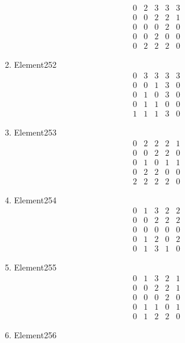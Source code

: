 \documentclass[12pt]{article}
\begin{document}
\begin{multicols}{3}
\begin{enumerate}
\begin{equation*}
\begin{array}{ccccc}
0&2&3&3&3\\
0&0&2&2&1\\
0&0&0&2&0\\
0&0&2&0&0\\
0&2&2&2&0
\end{array}
\end{equation*}
\item Element252
\begin{equation*}
\begin{array}{ccccc}
0&3&3&3&3\\
0&0&1&3&0\\
0&1&0&3&0\\
0&1&1&0&0\\
1&1&1&3&0
\end{array}
\end{equation*}
\item Element253
\begin{equation*}
\begin{array}{ccccc}
0&2&2&2&1\\
0&0&2&2&0\\
0&1&0&1&1\\
0&2&2&0&0\\
2&2&2&2&0
\end{array}
\end{equation*}
\item Element254
\begin{equation*}
\begin{array}{ccccc}
0&1&3&2&2\\
0&0&2&2&2\\
0&0&0&0&0\\
0&1&2&0&2\\
0&1&3&1&0
\end{array}
\end{equation*}
\item Element255
\begin{equation*}
\begin{array}{ccccc}
0&1&3&2&1\\
0&0&2&2&1\\
0&0&0&2&0\\
0&1&1&0&1\\
0&1&2&2&0
\end{array}
\end{equation*}
\item Element256
\begin{equation*}
\begin{array}{ccccc}

\end{array}
\end{equation*}
\end{enumerate}
\end{multicols}
\end{document}
